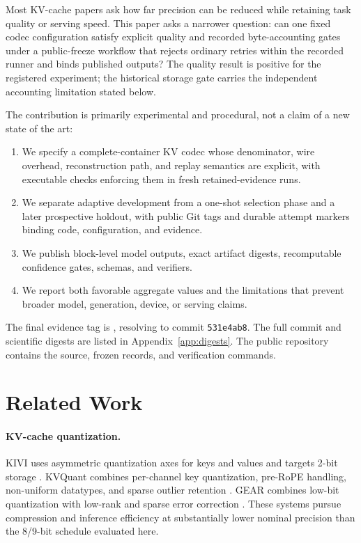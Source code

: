 \documentclass[10pt,twocolumn]{article}
\begin{document}
Most KV-cache papers ask how far precision can be reduced while retaining
task quality or serving speed. This paper asks a narrower question: can one
fixed codec configuration satisfy explicit quality and recorded byte-accounting gates
under a public-freeze workflow that rejects ordinary retries within the
recorded runner and binds published outputs? The quality result is positive for
the registered experiment; the historical storage gate carries the independent
accounting limitation stated below.

The contribution is primarily experimental and procedural, not a claim of a
new state of the art:
\begin{enumerate}[leftmargin=1.25em,itemsep=2pt,topsep=2pt]
  \item We specify a complete-container KV codec whose denominator, wire
        overhead, reconstruction path, and replay semantics are explicit, with
        executable checks enforcing them in fresh retained-evidence runs.
  \item We separate adaptive development from a one-shot selection phase and a
        later prospective holdout, with public Git tags and durable attempt
        markers binding code, configuration, and evidence.
  \item We publish block-level model outputs, exact artifact digests,
        recomputable confidence gates, schemas, and verifiers.
  \item We report both favorable aggregate values and the limitations that
        prevent broader model, generation, device, or serving claims.
\end{enumerate}

The final evidence tag is , resolving to commit
\texttt{531e4ab8}. The full commit and scientific digests are listed in
Appendix~\ref{app:digests}. The public repository contains the source, frozen
records, and verification commands.

\section{Related Work}

\paragraph{KV-cache quantization.}
KIVI uses asymmetric quantization axes for keys and values and targets 2-bit
storage \cite{liu2024kivi}. KVQuant combines per-channel key quantization,
pre-RoPE handling, non-uniform datatypes, and sparse outlier retention
\cite{hooper2024kvquant}. GEAR combines low-bit quantization with low-rank and
sparse error correction \cite{kang2024gear}. These systems pursue compression
and inference efficiency at substantially lower nominal precision than the
8/9-bit schedule evaluated here.
\end{document}
